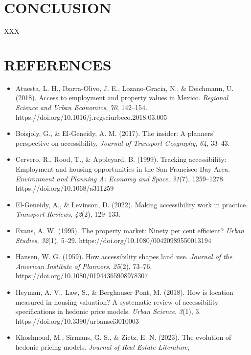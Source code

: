 \documentclass[
  12pt,
]{report}
\begin{document}
\newpage

\chapter{CONCLUSION}\label{conclusion}

XXX

\newpage

\chapter{REFERENCES}\label{references}

\begin{itemize}
\item
  Atuesta, L. H., Ibarra-Olivo, J. E., Lozano-Gracia, N., \& Deichmann,
  U. (2018). Access to employment and property values in Mexico.
  \emph{Regional Science and Urban Economics}, \emph{70}, 142--154.
  https://doi.org/10.1016/j.regsciurbeco.2018.03.005
\item
  Boisjoly, G., \& El-Geneidy, A. M. (2017). The insider: A planners'
  perspective on accessibility. \emph{Journal of Transport Geography},
  \emph{64}, 33--43.
\item
  Cervero, R., Rood, T., \& Appleyard, B. (1999). Tracking
  accessibility: Employment and housing opportunities in the San
  Francisco Bay Area. \emph{Environment and Planning A: Economy and
  Space}, \emph{31}(7), 1259--1278. https://doi.org/10.1068/a311259
\item
  El-Geneidy, A., \& Levinson, D. (2022). Making accessibility work in
  practice. \emph{Transport Reviews}, \emph{42}(2), 129--133.
\item
  Evans, A. W. (1995). The property market: Ninety per cent efficient?
  \emph{Urban Studies}, \emph{32}(1), 5--29.
  https://doi.org/10.1080/00420989550013194
\item
  Hansen, W. G. (1959). How accessibility shapes land use. \emph{Journal
  of the American Institute of Planners}, \emph{25}(2), 73--76.
  https://doi.org/10.1080/01944365908978307
\item
  Heyman, A. V., Law, S., \& Berghauser Pont, M. (2018). How is location
  measured in housing valuation? A systematic review of accessibility
  specifications in hedonic price models. \emph{Urban Science},
  \emph{3}(1), 3. https://doi.org/10.3390/urbansci3010003
\item
  Khoshnoud, M., Sirmans, G. S., \& Zietz, E. N. (2023). The evolution
  of hedonic pricing models. \emph{Journal of Real Estate Literature},

\end{itemize}
\end{document}
